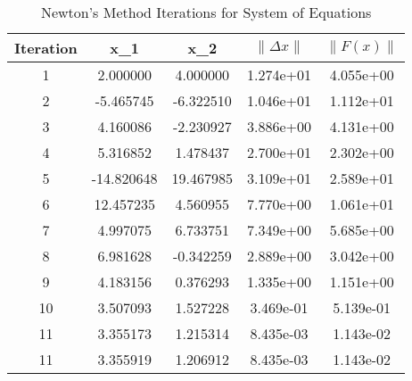 \begin{table}[H]
\centering
\begin{tabular}{|c|c|c|c|c|}
\hline
Iteration & x_1 & x_2 & $\|\Delta x\|$ & $\|F(x)\|$ \\ \hline
1 & 2.000000 & 4.000000 & 1.274e+01 & 4.055e+00 \\ \hline
2 & -5.465745 & -6.322510 & 1.046e+01 & 1.112e+01 \\ \hline
3 & 4.160086 & -2.230927 & 3.886e+00 & 4.131e+00 \\ \hline
4 & 5.316852 & 1.478437 & 2.700e+01 & 2.302e+00 \\ \hline
5 & -14.820648 & 19.467985 & 3.109e+01 & 2.589e+01 \\ \hline
6 & 12.457235 & 4.560955 & 7.770e+00 & 1.061e+01 \\ \hline
7 & 4.997075 & 6.733751 & 7.349e+00 & 5.685e+00 \\ \hline
8 & 6.981628 & -0.342259 & 2.889e+00 & 3.042e+00 \\ \hline
9 & 4.183156 & 0.376293 & 1.335e+00 & 1.151e+00 \\ \hline
10 & 3.507093 & 1.527228 & 3.469e-01 & 5.139e-01 \\ \hline
11 & 3.355173 & 1.215314 & 8.435e-03 & 1.143e-02 \\ \hline
11 & 3.355919 & 1.206912 & 8.435e-03 & 1.143e-02 \\ \hline
\end{tabular}
\caption{Newton's Method Iterations for System of Equations}
\end{table}
